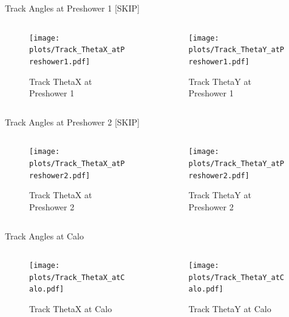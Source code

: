 \begin{subframe}{Track Angles at Preshower 1 [SKIP]}
	\begin{columns}
		\begin{column}{0.5\textwidth}
			\begin{figure}
				\texttt{[image: \\plots/Track\_ThetaX\_atPreshower1.pdf]}
				\caption{Track ThetaX at Preshower 1}
			\end{figure}
		\end{column}
		\begin{column}{0.5\textwidth}
			\begin{figure}
				\texttt{[image: \\plots/Track\_ThetaY\_atPreshower1.pdf]}
				\caption{Track ThetaY at Preshower 1}
			\end{figure}
		\end{column}
	\end{columns}
\end{subframe}

\begin{subframe}{Track Angles at Preshower 2 [SKIP]}
	\begin{columns}
		\begin{column}{0.5\textwidth}
			\begin{figure}
				\texttt{[image: \\plots/Track\_ThetaX\_atPreshower2.pdf]}
				\caption{Track ThetaX at Preshower 2}
			\end{figure}
		\end{column}
		\begin{column}{0.5\textwidth}
			\begin{figure}
				\texttt{[image: \\plots/Track\_ThetaY\_atPreshower2.pdf]}
				\caption{Track ThetaY at Preshower 2}
			\end{figure}
		\end{column}
	\end{columns}
\end{subframe}

\begin{frame}{Track Angles at Calo}
	\begin{columns}
		\begin{column}{0.5\textwidth}
			\begin{figure}
				\texttt{[image: \\plots/Track\_ThetaX\_atCalo.pdf]}
				\caption{Track ThetaX at Calo}
			\end{figure}
		\end{column}
		\begin{column}{0.5\textwidth}
			\begin{figure}
				\texttt{[image: \\plots/Track\_ThetaY\_atCalo.pdf]}
				\caption{Track ThetaY at Calo}
			\end{figure}
		\end{column}
	\end{columns}
\end{frame}

